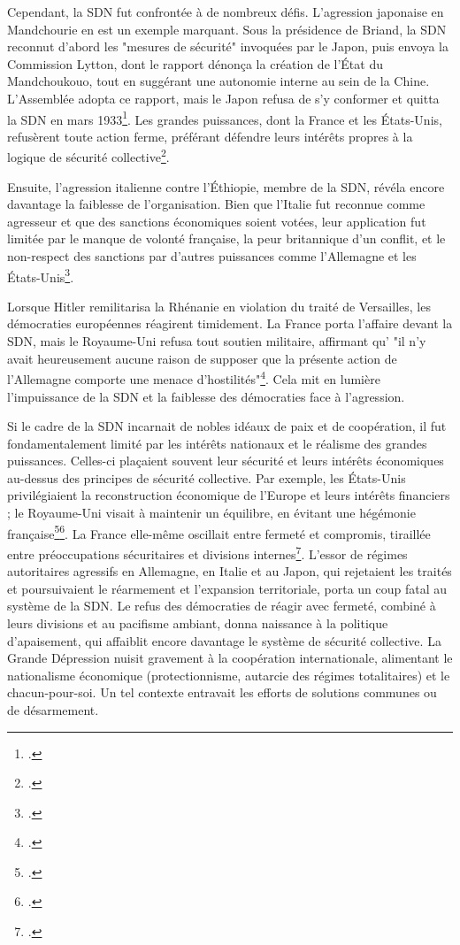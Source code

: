 \documentclass[a4paper,twoside,12pt]{book}
\begin{document}
Cependant, la SDN fut confrontée à de nombreux défis. L'agression japonaise en Mandchourie en est un exemple marquant. Sous la présidence de Briand, la SDN reconnut d'abord les "mesures de sécurité" invoquées par le Japon, puis envoya la Commission Lytton, dont le rapport dénonça la création de l'État du Mandchoukouo, tout en suggérant une autonomie interne au sein de la Chine. L'Assemblée adopta ce rapport, mais le Japon refusa de s'y conformer et quitta la SDN en mars 1933\footcite[p.138-139]{milza2019}. Les grandes puissances, dont la France et les États-Unis, refusèrent toute action ferme, préférant défendre leurs intérêts propres à la logique de sécurité collective\footcite[p.140-141]{milza2019}.

Ensuite, l'agression italienne contre l'Éthiopie, membre de la SDN, révéla encore davantage la faiblesse de l'organisation. Bien que l'Italie fut reconnue comme agresseur et que des sanctions économiques soient votées, leur application fut limitée par le manque de volonté française, la peur britannique d'un conflit, et le non-respect des sanctions par d'autres puissances comme l'Allemagne et les États-Unis\footcite[p.181]{milza2019}.

Lorsque Hitler remilitarisa la Rhénanie en violation du traité de Versailles, les démocraties européennes réagirent timidement. La France porta l'affaire devant la SDN, mais le Royaume-Uni refusa tout soutien militaire, affirmant qu' "il n'y avait heureusement aucune raison de supposer que la présente action de l'Allemagne comporte une menace d'hostilités"\footcite[p.186]{milza2019}. Cela mit en lumière l'impuissance de la SDN et la faiblesse des démocraties face à l'agression.

Si le cadre de la SDN incarnait de nobles idéaux de paix et de coopération, il fut fondamentalement limité par les intérêts nationaux et le réalisme des grandes puissances. Celles-ci plaçaient souvent leur sécurité et leurs intérêts économiques au-dessus des principes de sécurité collective. Par exemple, les États-Unis privilégiaient la reconstruction économique de l'Europe et leurs intérêts financiers ; le Royaume-Uni visait à maintenir un équilibre, en évitant une hégémonie française\footcite[p.51-52]{milza2019}\footcite[p.81]{montero2001}. La France elle-même oscillait entre fermeté et compromis, tiraillée entre préoccupations sécuritaires et divisions internes\footcite[p.81]{montero2001}. L'essor de régimes autoritaires agressifs en Allemagne, en Italie et au Japon, qui rejetaient les traités et poursuivaient le réarmement et l'expansion territoriale, porta un coup fatal au système de la SDN. Le refus des démocraties de réagir avec fermeté, combiné à leurs divisions et au pacifisme ambiant, donna naissance à la politique d'apaisement, qui affaiblit encore davantage le système de sécurité collective. La Grande Dépression nuisit gravement à la coopération internationale, alimentant le nationalisme économique (protectionnisme, autarcie des régimes totalitaires) et le chacun-pour-soi. Un tel contexte entravait les efforts de solutions communes ou de désarmement.
\end{document}
